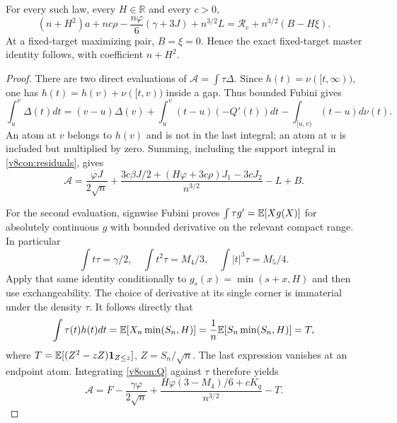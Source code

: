 \begin{theorem}\label{v8con:general}
For every such law, every $H\in\mathbb R$ and every $c>0$,
\begin{equation}\label{v8con:offcontact}
 (n+H^2)a+nc\rho-\frac{n\varphi}{6}(\gamma+3J)+n^{3/2}L
 =\mathcal R_c+n^{3/2}(B-H\xi).
\end{equation}
At a fixed-target maximizing pair, $B=\xi=0$. Hence the exact
fixed-target master identity follows, with coefficient $n+H^2$.
\end{theorem}
\begin{proof}
There are two direct evaluations of $\mathcal A=\int\tau\Delta$.
Since $h(t)=\nu([t,\infty))$, one has
$h(t)=h(v)+\nu([t,v))$ inside a gap. Thus bounded Fubini gives
\[
 \int_u^v\Delta(t)dt=(v-u)\Delta(v)
 +\int_u^v(t-u)(-Q'(t))dt
 -\int_{[u,v)}(t-u)d\nu(t).
\]
An atom at $v$ belongs to $h(v)$ and is not in the last integral;
an atom at $u$ is included but multiplied by zero. Summing, including
the support integral in \eqref{v8con:residuals}, gives
\begin{equation}\label{v8con:first}
 \mathcal A=\frac{\varphi J}{2\sqrt n}
 +\frac{3c\beta J/2+(H\varphi+3c\rho)J_1-3cJ_2}{n^{3/2}}-L+B.
\end{equation}

For the second evaluation, signwise Fubini proves
$\int\tau g'=\mathbb E[Xg(X)]$ for absolutely continuous $g$ with bounded
derivative on the relevant compact range. In particular
\[
 \int t\tau=\gamma/2,\quad \int t^2\tau=M_4/3,
 \quad\int |t|^3\tau=M_5/4.
\]
Apply that same identity conditionally to
$g_s(x)=\min(s+x,H)$ and then use exchangeability. The choice of
derivative at its single corner is immaterial under the density $\tau$.
It follows directly that
\[
 \int\tau(t)h(t)dt=\mathbb E[X_n\min(S_n,H)]
 =\frac1n\mathbb E[S_n\min(S_n,H)]
 =T,
\]
where $T=\mathbb E[(Z^2-zZ)\mathbf1_{Z\le z}]$, $Z=S_n/\sqrt n$.
The last expression vanishes at an endpoint atom. Integrating
\eqref{v8con:Q} against $\tau$ therefore yields
\begin{equation}\label{v8con:second}
 \mathcal A=F-\frac{\gamma\varphi}{2\sqrt n}
 +\frac{H\varphi(3-M_4)/6+cK_q}{n^{3/2}}-T.
\end{equation}


\end{proof}
